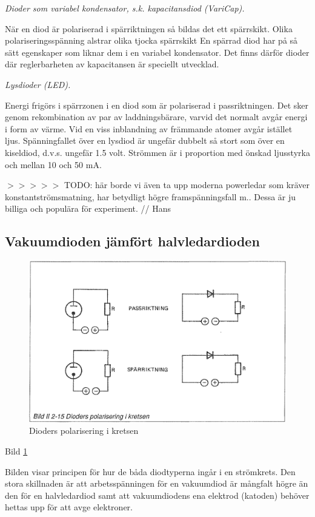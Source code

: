\emph{Dioder som variabel kondensator, s.k. kapacitansdiod (VariCap).}

  När en diod är polariserad i spärriktningen så bildas det ett spärrskikt.
  Olika polariseringsspänning alstrar olika tjocka spärrskikt En spärrad diod
  har på så sätt egenskaper som liknar dem i en variabel kondensator. Det finns
  därför dioder där reglerbarheten av kapacitansen är speciellt utvecklad.

\emph{Lysdioder (LED).}

  Energi frigörs i spärrzonen i en diod som är polariserad i passriktningen. Det
  sker genom rekombination av par av laddningsbärare, varvid det normalt avgår
  energi i form av värme. Vid en viss inblandning av främmande atomer avgår
  istället ljus. Spänningfallet över en lysdiod är ungefär dubbelt så stort som
  över en kiseldiod, d.v.s. ungefär 1.5 volt. Strömmen är i proportion med
  önskad ljusstyrka och mellan 10 och 50 mA.

  $>>>>>$ TODO: här borde vi även ta upp moderna powerledar som kräver
  konstantströmsmatning, har betydligt högre framspänningsfall m..
  Dessa är ju billiga och populära för experiment. // Hans

\subsection{Vakuumdioden jämfört halvledardioden}

\begin{figure}[h]
\begin{center}
\includegraphics[width=14cm]{images/bild_2_2-15}
\caption{Dioders polarisering i kretsen}
\label{fig:BildII2-15}
\end{center}
\end{figure}

Bild \ref{fig:BildII2-15}

Bilden visar principen för hur de båda diodtyperna ingår i en strömkrets. Den
stora skillnaden är att arbetsspänningen för en vakuumdiod är mångfalt högre än
den för en halvledardiod samt att vakuumdiodens ena elektrod (katoden) behöver
hettas upp för att avge elektroner.
